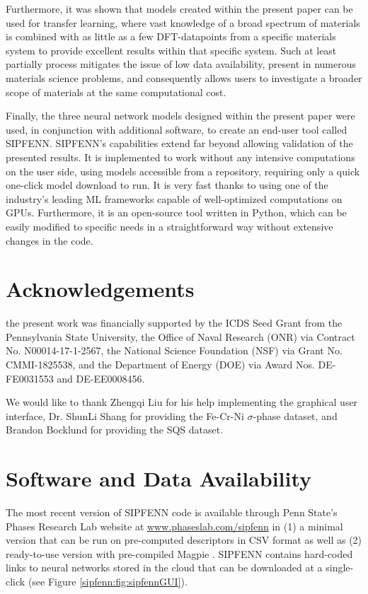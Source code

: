 Furthermore, it was shown that models created within the present paper can be used for transfer learning, where vast knowledge of a broad spectrum of materials is combined with as little as a few DFT-datapoints from a specific materials system to provide excellent results within that specific system. Such at least partially process mitigates the issue of low data availability, present in numerous materials science problems, and consequently allows users to investigate a broader scope of materials at the same computational cost.

Finally, the three neural network models designed within the present paper were used, in conjunction with additional software, to create an end-user tool called SIPFENN. SIPFENN's capabilities extend far beyond allowing validation of the presented results. It is implemented to work without any intensive computations on the user side, using models accessible from a repository, requiring only a quick one-click model download  to run. It is very fast thanks to using one of the industry's leading ML frameworks capable of well-optimized computations on GPUs. Furthermore, it is an open-source tool written in Python, which can be easily modified to specific needs in a straightforward way without extensive changes in the code.

\section{Acknowledgements}
the present work was financially supported by the ICDS Seed Grant from the Pennsylvania State University, the Office of Naval Research (ONR) via Contract No. N00014-17-1-2567, the National Science Foundation (NSF) via Grant No. CMMI-1825538, and the Department of Energy (DOE) via Award Nos. DE-FE0031553 and DE-EE0008456. 

We would like to thank Zhengqi Liu for his help implementing the graphical user interface, Dr. ShunLi Shang for providing the Fe-Cr-Ni $\sigma$-phase dataset, and Brandon Bocklund for providing the SQS dataset.


\section{Software and Data Availability}
The most recent version of SIPFENN code is available through Penn State's Phases Research Lab website at 
\hyperlink{www.phaseslab.com/sipfenn}{www.phaseslab.com/sipfenn} in (1) a minimal version that can be run on pre-computed descriptors in CSV format as well as (2) ready-to-use version with pre-compiled Magpie \cite{Ward2016AMaterials}. SIPFENN contains hard-coded links to neural networks stored in the cloud that can be downloaded at a single-click (see Figure \ref{sipfenn:fig:sipfennGUI}). 

